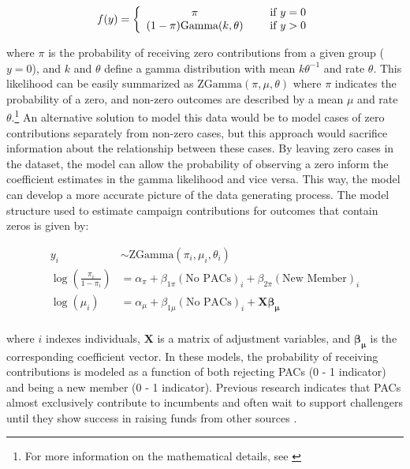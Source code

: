 \documentclass[12pt]{article}
\begin{document}
\begin{align}
f(y) = \left\{ \begin{array}{cc} 
                \pi & \hspace{5mm} \text{if $y = 0$} \\
                (1 - \pi) \text{Gamma}(k, \theta) & \hspace{5mm}  \text{if $y > 0$} \\
                \end{array} \right.
\end{align}

\noindent where $\pi$ is the probability of receiving zero contributions from a given group ($y = 0$), and $k$ and $\theta$ define a gamma distribution with mean $k\theta^{-1}$ and rate $\theta$. This likelihood can be easily summarized as $\text{ZGamma}(\pi, \mu, \theta)$ where $\pi$ indicates the probability of a zero, and non-zero outcomes are described by a mean $\mu$ and rate $\theta$.\footnote{For more information on the mathematical details, see \citet{mccullagn1989}} An alternative solution to model this data would be to model cases of zero contributions separately from non-zero cases, but this approach would sacrifice information about the relationship between these cases. By leaving zero cases in the dataset, the model can allow the probability of observing a zero inform the coefficient estimates in the gamma likelihood and vice versa. This way, the model can develop a more accurate picture of the data generating process. The model structure used to estimate campaign contributions for outcomes that contain zeros is given by: 

$$
\begin{aligned}
    y_i &\sim \text{ZGamma}(\pi_i, \mu_i, \theta_i) \\
    \log \left( \frac{\pi_i}{1 - \pi_i} \right) &= \alpha_{\pi} + \beta_{1\pi} (\text{No PACs})_i + \beta_{2\pi} (\text{New Member})_i \\
    \log(\mu_i) &= \alpha_{\mu} + \beta_{1\mu} (\text{No PACs})_i + \bm{X} \bm{\beta_{\mu}} \\
\end{aligned}
$$

\noindent where $i$ indexes individuals, $\bm{X}$ is a matrix of adjustment variables, and $\bm{\beta_{\mu}}$ is the corresponding coefficient vector. In these models, the probability of receiving contributions is modeled as a function of both rejecting PACs (0 - 1 indicator) and being a new member (0 - 1 indicator). Previous research indicates that PACs almost exclusively contribute to incumbents \citep{brunell2005} and often wait to support challengers until they show success in raising funds from other sources \citep{biersack1993}. 
\end{document}
